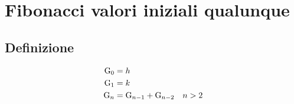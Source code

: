  \chapter{Fibonacci valori iniziali qualunque}
\section{Definizione}
\begin{defn}
	\begin{align}
		\mathrm{G}_{0}={}&h\notag\\
		\mathrm{G}_{1}={}&k\notag\\
		\mathrm{G}_{n}={}&\mathrm{G}_{n-1}+\mathrm{G}_{n-2}\quad n>2\label{eqn:FiboGendef}
	\end{align}
\end{defn}
